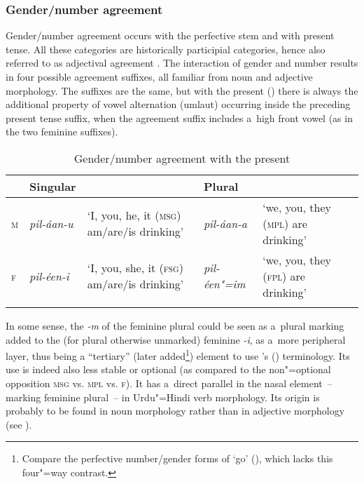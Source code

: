 \subsubsection*{Gender/number agreement}

Gender/number agreement occurs with the perfective stem and with present tense. All these categories
are historically participial categories, hence also referred to as adjectival agreement
\citep[260]{masica1991}. The interaction of gender and number results in four possible agreement suffixes, all familiar from noun and adjective morphology. The suffixes are the same, but with the present () there is always the additional property of vowel alternation (umlaut) occurring inside the preceding present tense suffix, when the agreement suffix includes a~high front vowel (as in the two feminine suffixes).

\begin{table}[b]
\caption{Gender/number agreement with the present}
\begin{tabularx}{\textwidth}{ l l Q l Q }
\lsptoprule
&
Singular &
&
Plural &
\\\midrule
\textsc{m} &
\textit{pil-áan-u} &
`I, you, he, it (\textsc{msg}) am/are/is drinking' &
\textit{pil-áan-a} &
`we, you, they (\textsc{mpl}) are drinking'\\
\textsc{f} &
\textit{pil-éen-i} &
`I, you, she, it (\textsc{fsg}) am/are/is drinking' &
\textit{pil-éen"=im} &
`we, you, they (\textsc{fpl}) are drinking'\\\lspbottomrule
\end{tabularx}
\label{tab:8-18}
\end{table}




In some sense, the \textit{-m} of the feminine plural could be seen as a~plural marking added to the (for plural otherwise unmarked) feminine \textit{-i}, as a~more peripheral layer, thus being a ``tertiary'' (later added\footnote{Compare the perfective number/gender forms of `go' (), which lacks this four"=way contrast.}) element to use \citeauthor{masica1991}'s (\citeyear[260--261]{masica1991}) terminology. Its use is indeed also less stable or optional (as compared to the non"=optional opposition \textsc{msg} vs. \textsc{mpl} vs. \textsc{f}). It has a~direct parallel in the nasal element~-- marking feminine plural~-- in Urdu"=Hindi verb morphology. Its origin is probably to be found in noun morphology rather than in adjective morphology (see ).


